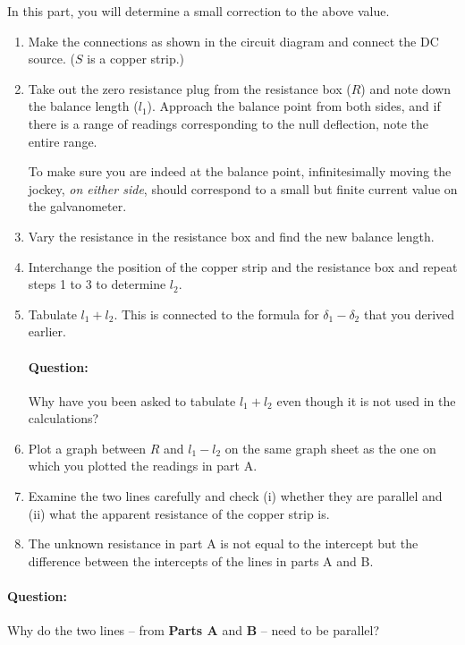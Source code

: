 \begin{refsection}
In this part, you will determine a small correction to the above value. 
\begin{enumerate}
    \item Make the connections as shown in the circuit diagram and connect the DC source. ($S$ is a copper strip.)
    \item Take out the zero resistance plug from the resistance box ($R$) and note down the balance length ($l_1$). Approach the balance point from both sides, and if there is a range of readings corresponding to the null deflection, note the entire range. 
    \begin{tip}
        To make sure you are indeed at the balance point, infinitesimally moving the jockey, \textit{on either side}, should correspond to a small but finite current value on the galvanometer.
    \end{tip}
    \item Vary the resistance in the resistance box and find the new balance length.
    \item Interchange the position of the copper strip and the resistance box and repeat steps 1 to 3 to determine $l_2$.
    \item Tabulate $l_1 + l_2$. This is connected to the formula for $\delta_1 - \delta_2$ that you derived earlier.
    \begin{question}
    \paragraph{Question:} Why have you been asked to tabulate $l_1 + l_2$ even though it is not used in the calculations?
    \end{question}
    \item Plot a graph between $R$ and $l_1 -l_2$ on the same graph sheet as the one on which you plotted the readings in part A. 
    \item Examine the two lines carefully and check (i) whether they are parallel and (ii) what the apparent resistance of the copper strip is. 
    \item The unknown resistance in part A is not equal to the intercept but the difference between the intercepts of the lines in parts A and B. 
    
\end{enumerate}

\begin{question}
\paragraph{Question:} Why do the two lines -- from \textbf{Parts A} and \textbf{B} -- need to be parallel?

\end{question}
\end{refsection}
